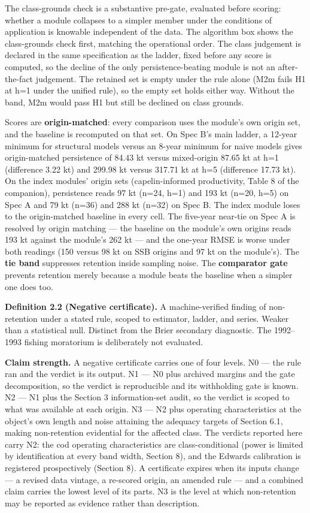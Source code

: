 \documentclass[11pt]{article}
\begin{document}
The class-grounds check is a substantive pre-gate, evaluated before
scoring: whether a module collapses to a simpler member under the
conditions of application is knowable independent of the data. The
algorithm box shows the class-grounds check first, matching the
operational order. The class judgement is declared in the same
specification as the ladder, fixed before any score is computed, so the
decline of the only persistence-beating module is not an after-the-fact
judgement. The retained set is empty under the rule alone (M2m fails H1
at h=1 under the unified rule), so the empty set holds either way.
Without the band, M2m would pass H1 but still be declined on class
grounds.

Scores are \textbf{origin-matched}: every comparison uses the module's
own origin set, and the baseline is recomputed on that set. On Spec B's
main ladder, a 12-year minimum for structural models versus an 8-year
minimum for naive models gives origin-matched persistence of 84.43 kt
versus mixed-origin 87.65 kt at h=1 (difference 3.22 kt) and 299.98 kt
versus 317.71 kt at h=5 (difference 17.73 kt). On the index modules'
origin sets (capelin-informed productivity, Table 8 of the companion),
persistence reads 97 kt (n=24, h=1) and 193 kt (n=20, h=5) on Spec A and
79 kt (n=36) and 288 kt (n=32) on Spec B. The index module loses to the
origin-matched baseline in every cell. The five-year near-tie on Spec A
is resolved by origin matching --- the baseline on the module's own
origins reads 193 kt against the module's 262 kt --- and the one-year
RMSE is worse under both readings (150 versus 98 kt on SSB origins and
97 kt on the module's). The \textbf{tie band} suppresses retention
inside sampling noise. The \textbf{comparator gate} prevents retention
merely because a module beats the baseline when a simpler one does too.

\textbf{Definition 2.2 (Negative certificate).} A machine-verified
finding of non-retention under a stated rule, scoped to estimator,
ladder, and series. Weaker than a statistical null. Distinct from the
Brier secondary diagnostic. The 1992--1993 fishing moratorium is
deliberately not evaluated.

\textbf{Claim strength.} A negative certificate carries one of four
levels. N0 --- the rule ran and the verdict is its output. N1 --- N0
plus archived margins and the gate decomposition, so the verdict is
reproducible and its withholding gate is known. N2 --- N1 plus the
Section 3 information-set audit, so the verdict is scoped to what was
available at each origin. N3 --- N2 plus operating characteristics at
the object's own length and noise attaining the adequacy targets of
Section 6.1, making non-retention evidential for the affected class. The
verdicts reported here carry N2: the cod operating characteristics are
class-conditional (power is limited by identification at every band
width, Section 8), and the Edwards calibration is registered
prospectively (Section 8). A certificate expires when its inputs change
--- a revised data vintage, a re-scored origin, an amended rule --- and
a combined claim carries the lowest level of its parts. N3 is the level
at which non-retention may be reported as evidence rather than
description.
\end{document}
